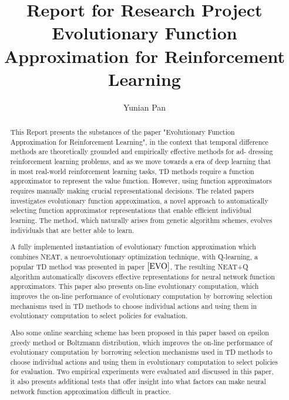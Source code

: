 \documentclass[journal]{IEEEtran}
\begin{document}
\title{Report for Research Project\\ Evolutionary Function Approximation for Reinforcement Learning }





\author{Yunian Pan}




\maketitle

\begin{abstract}

This Report presents the substances of the paper "Evolutionary Function Approximation for Reinforcement Learning", in the context that
temporal difference methods are theoretically grounded and empirically effective methods for ad- dressing reinforcement learning problems,
and as we move towards a era of deep learning that in most real-world reinforcement learning tasks, 
TD methods require a function approximator to represent the value function. However, using function approximators
 requires manually making crucial representational decisions. The related papers investigates evolutionary function approximation, 
 a novel approach to automatically selecting function approximator representations that enable efficient individual learning. 
 The method, which naturally arises from genetic algorithm schemes, evolves individuals that are better able to learn. 
 
 A fully implemented instantiation of evolutionary function approximation which combines NEAT, a neuroevolutionary optimization technique,
  with Q-learning, a popular TD method was presented in paper $\cite{EVO}$, The resulting NEAT+Q algorithm automatically discovers effective
  representations for neural network function approximators. This paper also presents on-line evolutionary computation, which improves
   the on-line performance of evolutionary computation by borrowing selection mechanisms used in TD methods to choose individual actions
    and using them in evolutionary computation to select policies for evaluation. 

  Also some online searching scheme has been proposed in this paper based on epsilon greedy method or Boltzmann distribution, which improves 
  the on-line performance of evolutionary computation by borrowing selection mechanisms used in TD methods to choose individual actions 
  and using them in evolutionary computation to select policies for evaluation. Two empirical experiments were evaluated and discussed
  in this paper, it also presents additional tests that offer insight into what factors can make neural network function approximation difficult in practice.




\end{abstract}
\end{document}
